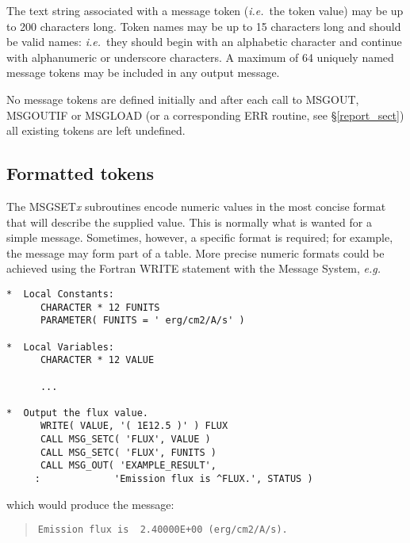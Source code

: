 \documentclass[twoside,11pt]{article}
\newcommand{\htmlref}[2]{#1}
\newcommand{\latex}[1]{#1}
\newcommand{\xlabel}[1]{}
\renewcommand{\_}{\texttt{\symbol{95}}}
\begin{document}
The text string associated with a message token (\textit{i.e.}\ the token value)
may be up to 200 characters long.
Token names may be up to 15 characters long and should be valid names:
\textit{i.e.}\ they should begin with an alphabetic character and continue with
alphanumeric or underscore characters.
A maximum of 64 uniquely named message tokens may be included in any output
message. 

No message tokens are defined initially and
after each call to MSG\_OUT, MSG\_OUTIF or MSG\_LOAD (or 
\htmlref{a corresponding ERR 
routine}{report_sect}\latex{, see \S\ref{report_sect}}) 
all existing tokens are left undefined. 

\subsection{\xlabel{formatted_tokens}Formatted tokens}
The MSG\_SET\textit{x} subroutines encode numeric values in the most concise 
format that will describe the supplied value. 
This is normally what is wanted for a simple message. 
Sometimes, however, a specific format is required; for example, the message
may form part of a table. 
More precise numeric formats could be achieved using the Fortran WRITE
statement with the Message System, \textit{e.g.}

\begin {small}
\begin{verbatim}
*  Local Constants:
      CHARACTER * 12 FUNITS
      PARAMETER( FUNITS = ' erg/cm2/A/s' )

*  Local Variables:
      CHARACTER * 12 VALUE

      ...

*  Output the flux value.
      WRITE( VALUE, '( 1E12.5 )' ) FLUX
      CALL MSG_SETC( 'FLUX', VALUE )
      CALL MSG_SETC( 'FLUX', FUNITS )
      CALL MSG_OUT( 'EXAMPLE_RESULT', 
     :             'Emission flux is ^FLUX.', STATUS )
\end{verbatim}
\end {small}

which would produce the message:

\begin {quote}
\begin {small}
\begin{verbatim}
Emission flux is  2.40000E+00 (erg/cm2/A/s).
\end{verbatim}
\end {small}
\end {quote}
\end{document}
